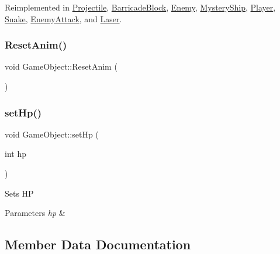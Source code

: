 Reimplemented in \mbox{\hyperlink{class_projectile_a871e265207d2bf2d5180152a7acf2d40}{Projectile}}, \mbox{\hyperlink{class_barricade_block_ac01d18a8afea6f0b15c7ec7b0167c7f1}{Barricade\+Block}}, \mbox{\hyperlink{class_enemy_adcde768475970dae1e4c3e76fb59bc46}{Enemy}}, \mbox{\hyperlink{class_mystery_ship_ace0406106086ab58d8da318e902ade0a}{Mystery\+Ship}}, \mbox{\hyperlink{class_player_ae30c8d49de94ee8c73ed6ab6315a2854}{Player}}, \mbox{\hyperlink{class_snake_a1f01e21a73734f9c0d701ec02a9d2e41}{Snake}}, \mbox{\hyperlink{class_enemy_attack_a2f735b2cbf13787217a5daed7ff8f7a4}{Enemy\+Attack}}, and \mbox{\hyperlink{class_laser_a1f2135281ecc1b318357633f4e7dd34c}{Laser}}.

\mbox{\label{class_game_object_a29708ce7009e5de901438b9a4f02e365}} 
\subsubsection{\texorpdfstring{Reset\+Anim()}{ResetAnim()}}
{\footnotesize\ttfamily void Game\+Object\+::\+Reset\+Anim (\begin{DoxyParamCaption}{ }\end{DoxyParamCaption})}

\mbox{\label{class_game_object_a7aa67e2bbfd37af89d86df0b030b5a81}} 
\subsubsection{\texorpdfstring{set\+Hp()}{setHp()}}
{\footnotesize\ttfamily void Game\+Object\+::set\+Hp (\begin{DoxyParamCaption}\item[{int}]{hp }\end{DoxyParamCaption})}



Sets HP 


\begin{DoxyParams}{Parameters}
{\em hp} & \\
\hline
\end{DoxyParams}


\subsection{Member Data Documentation}
\mbox{\label{class_game_object_a98291c60da12d9036e1ad24cfebcf6b3}} 
